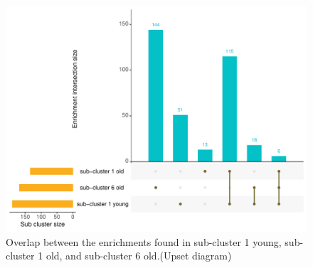 \begin{figure}[ht]
    \includegraphics[width=\textwidth, center]{img/annexe_add_file_GWENA/additional_file_figure_5.pdf}
    \caption{Overlap between the enrichments found in sub-cluster 1 young, sub-cluster 1 old, and sub-cluster 6 old.(Upset diagram)}
    \label{fig:supp_fig_upset_subclusters_enrichments}
\end{figure} 


% 
% 